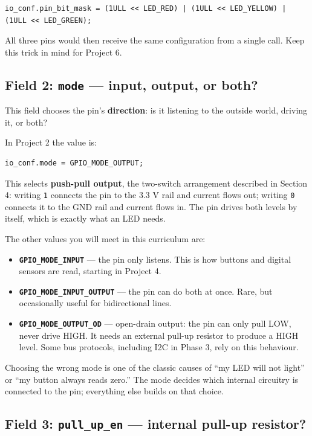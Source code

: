 \documentclass[11pt]{article}
\begin{document}
\begin{verbatim}
io_conf.pin_bit_mask = (1ULL << LED_RED) | (1ULL << LED_YELLOW) | (1ULL << LED_GREEN);
\end{verbatim}

All three pins would then receive the same configuration from a single call. Keep this trick in mind for Project 6.

\subsection{Field 2: \texttt{mode} --- input, output, or both?}

This field chooses the pin's \textbf{direction}: is it listening to the outside world, driving it, or both?

In Project 2 the value is:

\begin{verbatim}
io_conf.mode = GPIO_MODE_OUTPUT;
\end{verbatim}

This selects \textbf{push-pull output}, the two-switch arrangement described in Section 4: writing \texttt{1} connects the pin to the 3.3 V rail and current flows out; writing \texttt{0} connects it to the GND rail and current flows in. The pin drives both levels by itself, which is exactly what an LED needs.

The other values you will meet in this curriculum are:

\begin{itemize}
    \item \textbf{\texttt{GPIO\_MODE\_INPUT}} --- the pin only listens. This is how buttons and digital sensors are read, starting in Project 4.
    \item \textbf{\texttt{GPIO\_MODE\_INPUT\_OUTPUT}} --- the pin can do both at once. Rare, but occasionally useful for bidirectional lines.
    \item \textbf{\texttt{GPIO\_MODE\_OUTPUT\_OD}} --- open-drain output: the pin can only pull LOW, never drive HIGH. It needs an external pull-up resistor to produce a HIGH level. Some bus protocols, including I2C in Phase 3, rely on this behaviour.
\end{itemize}

Choosing the wrong mode is one of the classic causes of ``my LED will not light'' or ``my button always reads zero.'' The mode decides which internal circuitry is connected to the pin; everything else builds on that choice.

\subsection{Field 3: \texttt{pull\_up\_en} --- internal pull-up resistor?}
\end{document}
